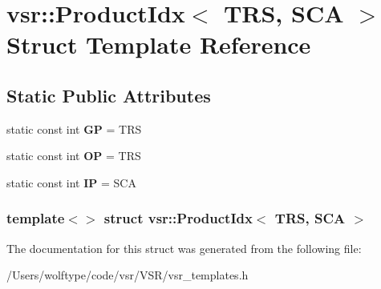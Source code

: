\hypertarget{structvsr_1_1_product_idx_3_01_t_r_s_00_01_s_c_a_01_4}{\section{vsr\-:\-:Product\-Idx$<$ T\-R\-S, S\-C\-A $>$ Struct Template Reference}
\label{structvsr_1_1_product_idx_3_01_t_r_s_00_01_s_c_a_01_4}
}
\subsection*{Static Public Attributes}
\begin{DoxyCompactItemize}
\item 
\hypertarget{structvsr_1_1_product_idx_3_01_t_r_s_00_01_s_c_a_01_4_a2a23827fac8db68ffe49a285c19bea13}{static const int {\bfseries G\-P} = T\-R\-S}\label{structvsr_1_1_product_idx_3_01_t_r_s_00_01_s_c_a_01_4_a2a23827fac8db68ffe49a285c19bea13}

\item 
\hypertarget{structvsr_1_1_product_idx_3_01_t_r_s_00_01_s_c_a_01_4_a2f9671c0207352f5ec17eb989aabf9fc}{static const int {\bfseries O\-P} = T\-R\-S}\label{structvsr_1_1_product_idx_3_01_t_r_s_00_01_s_c_a_01_4_a2f9671c0207352f5ec17eb989aabf9fc}

\item 
\hypertarget{structvsr_1_1_product_idx_3_01_t_r_s_00_01_s_c_a_01_4_a9e824854df8dac489abb3ab788932d36}{static const int {\bfseries I\-P} = S\-C\-A}\label{structvsr_1_1_product_idx_3_01_t_r_s_00_01_s_c_a_01_4_a9e824854df8dac489abb3ab788932d36}

\end{DoxyCompactItemize}
\subsubsection*{template$<$$>$ struct vsr\-::\-Product\-Idx$<$ T\-R\-S, S\-C\-A $>$}



The documentation for this struct was generated from the following file\-:\begin{DoxyCompactItemize}
\item 
/\-Users/wolftype/code/vsr/\-V\-S\-R/vsr\-\_\-templates.\-h\end{DoxyCompactItemize}

